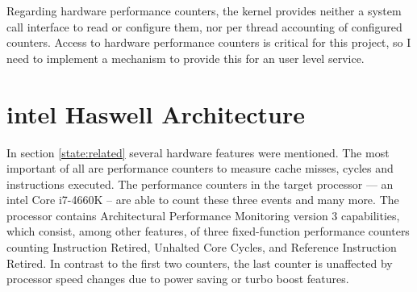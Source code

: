 Regarding hardware performance counters, the kernel provides neither a system
call interface to read or configure them, nor per thread accounting of
configured counters.
Access to hardware performance counters is critical for this project, so I need
to implement a mechanism to provide this for an user level service.



\begin{comment}
\textbf{Fiasco.OC}
\begin{itemize}
  \item Kernel scheduler does no balancing, assigns thread to the first
    core specified in the affinity descriptor
  \item affinity descriptor: core(s) a thread should run on
  \item Syscall via run\_thread() to pass affinity descr to kernel scheduler
  \item interface to query execution time for each thread
  \item capability system -- to derive communication relationships from
  \item	Kernel feature wishes derived from related work: Performance counters
    and per thread accounting
\end{itemize}

\textbf{L4Re}
\begin{itemize}
  \item provides scheduler proxy interface, including affinity descriptor,
    scheduling parameters
  \item syscall interface
\end{itemize}
\end{comment}



\section{\gls{intel} Haswell Architecture}
\label{state:haswell}

In section \ref{state:related} several hardware features were mentioned.
The most important of all are performance counters to measure cache misses, cycles and
instructions executed.
The performance counters in the target processor --- an \gls{intel} Core
i7-4660K -- are able to count these three events and many more.
The processor contains Architectural Performance Monitoring version 3
capabilities, which consist, among other features, of three fixed-function
performance counters counting Instruction Retired, Unhalted Core Cycles, and
Reference Instruction Retired.
In contrast to the first two counters, the last counter is unaffected by
processor speed changes due to power saving or turbo boost features.

